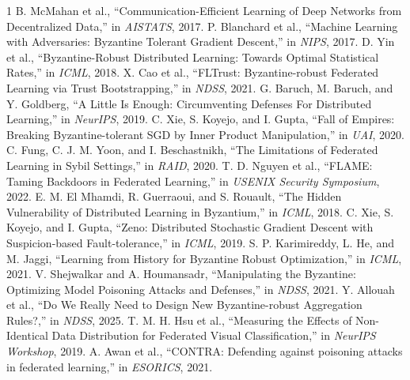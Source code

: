 \documentclass[10pt, conference]{IEEEtran}
\begin{document}

\begin{thebibliography}{1}
B. McMahan et al., ``Communication-Efficient Learning of Deep Networks from Decentralized Data,'' in \textit{AISTATS}, 2017.
P. Blanchard et al., ``Machine Learning with Adversaries: Byzantine Tolerant Gradient Descent,'' in \textit{NIPS}, 2017.
D. Yin et al., ``Byzantine-Robust Distributed Learning: Towards Optimal Statistical Rates,'' in \textit{ICML}, 2018.
X. Cao et al., ``FLTrust: Byzantine-robust Federated Learning via Trust Bootstrapping,'' in \textit{NDSS}, 2021.
G. Baruch, M. Baruch, and Y. Goldberg, ``A Little Is Enough: Circumventing Defenses For Distributed Learning,'' in \textit{NeurIPS}, 2019.
C. Xie, S. Koyejo, and I. Gupta, ``Fall of Empires: Breaking Byzantine-tolerant SGD by Inner Product Manipulation,'' in \textit{UAI}, 2020.
C. Fung, C. J. M. Yoon, and I. Beschastnikh, ``The Limitations of Federated Learning in Sybil Settings,'' in \textit{RAID}, 2020.
T. D. Nguyen et al., ``FLAME: Taming Backdoors in Federated Learning,'' in \textit{USENIX Security Symposium}, 2022.
E. M. El Mhamdi, R. Guerraoui, and S. Rouault, ``The Hidden Vulnerability of Distributed Learning in Byzantium,'' in \textit{ICML}, 2018.
C. Xie, S. Koyejo, and I. Gupta, ``Zeno: Distributed Stochastic Gradient Descent with Suspicion-based Fault-tolerance,'' in \textit{ICML}, 2019.
S. P. Karimireddy, L. He, and M. Jaggi, ``Learning from History for Byzantine Robust Optimization,'' in \textit{ICML}, 2021.
V. Shejwalkar and A. Houmansadr, ``Manipulating the Byzantine: Optimizing Model Poisoning Attacks and Defenses,'' in \textit{NDSS}, 2021.
Y. Allouah et al., ``Do We Really Need to Design New Byzantine-robust Aggregation Rules?,'' in \textit{NDSS}, 2025.
T. M. H. Hsu et al., ``Measuring the Effects of Non-Identical Data Distribution for Federated Visual Classification,'' in \textit{NeurIPS Workshop}, 2019.
A. Awan et al., ``CONTRA: Defending against poisoning attacks in federated learning,'' in \textit{ESORICS}, 2021.
\end{thebibliography}
\end{document}
